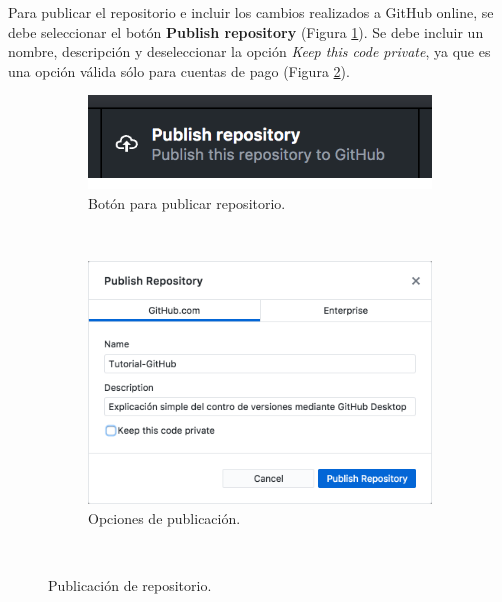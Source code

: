 \documentclass[10pt]{article}
\begin{document}
Para publicar el repositorio e incluir los cambios realizados a GitHub online, se debe seleccionar el botón \textbf{Publish repository} (Figura \ref{pure1}). Se debe incluir un nombre, descripción y deseleccionar la opción \textit{Keep this code private}, ya que es una opción válida sólo para cuentas de pago (Figura \ref{pure2}).\\

\begin{figure}[!h]
    \centering
    \begin{subfigure}[b]{0.25\textwidth}
        \includegraphics[width=\textwidth]{Figuras/pure1.png}
        \caption{Botón para publicar repositorio.}
        \label{pure1}
    \end{subfigure}
    ~ %
    \begin{subfigure}[b]{0.5\textwidth}
        \includegraphics[width=\textwidth]{Figuras/pure2.png}
        \caption{Opciones de publicación.}
        \label{pure2}
    \end{subfigure}
    ~ %
    \caption{Publicación de repositorio.}\label{pure}
\end{figure}
\end{document}
